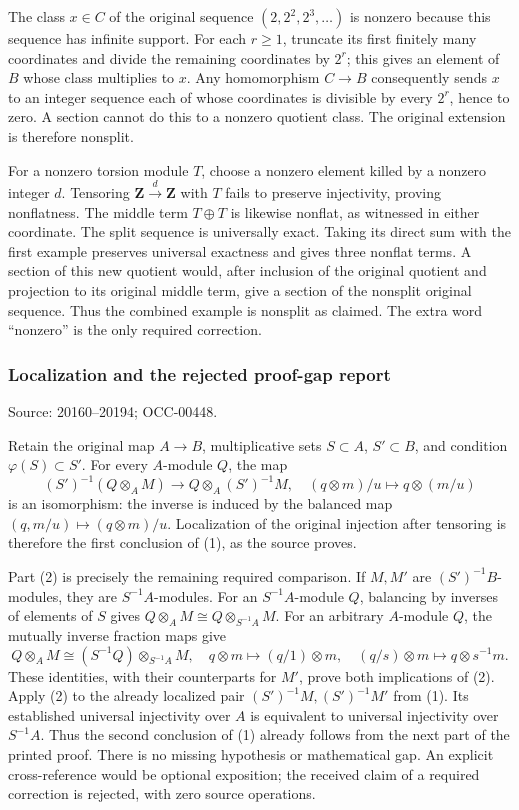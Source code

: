 The class \(x\in C\) of the original sequence \((2,2^2,2^3,\ldots)\) is nonzero because this sequence has infinite support. For each \(r\geq1\), truncate its first finitely many coordinates and divide the remaining coordinates by \(2^r\); this gives an element of \(B\) whose class multiplies to \(x\). Any homomorphism \(C\to B\) consequently sends \(x\) to an integer sequence each of whose coordinates is divisible by every \(2^r\), hence to zero. A section cannot do this to a nonzero quotient class. The original extension is therefore nonsplit.

For a nonzero torsion module \(T\), choose a nonzero element killed by a nonzero integer \(d\). Tensoring \(\mathbf Z\xrightarrow{d}\mathbf Z\) with \(T\) fails to preserve injectivity, proving nonflatness. The middle term \(T\oplus T\) is likewise nonflat, as witnessed in either coordinate. The split sequence is universally exact. Taking its direct sum with the first example preserves universal exactness and gives three nonflat terms. A section of this new quotient would, after inclusion of the original quotient and projection to its original middle term, give a section of the nonsplit original sequence. Thus the combined example is nonsplit as claimed. The extra word ``nonzero'' is the only required correction.

\subsubsection{Localization and the rejected proof-gap report}\label{algebra-proof-010-localization-and-the-rejected-proof-gap-report}

Source: 20160--20194; OCC-00448.

Retain the original map \(A\to B\), multiplicative sets \(S\subset A\), \(S'\subset B\), and condition \(\varphi(S)\subset S'\). For every \(A\)-module \(Q\), the map \[
(S')^{-1}(Q\otimes_AM)\longrightarrow Q\otimes_A(S')^{-1}M,
\quad (q\otimes m)/u\longmapsto q\otimes(m/u)
\] is an isomorphism: the inverse is induced by the balanced map \((q,m/u)\mapsto(q\otimes m)/u\). Localization of the original injection after tensoring is therefore the first conclusion of (1), as the source proves.

Part (2) is precisely the remaining required comparison. If \(M,M'\) are \((S')^{-1}B\)-modules, they are \(S^{-1}A\)-modules. For an \(S^{-1}A\)-module \(Q\), balancing by inverses of elements of \(S\) gives \(Q\otimes_AM\cong Q\otimes_{S^{-1}A}M\). For an arbitrary \(A\)-module \(Q\), the mutually inverse fraction maps give \[
Q\otimes_AM\cong(S^{-1}Q)\otimes_{S^{-1}A}M,
\quad q\otimes m\mapsto(q/1)\otimes m,
\quad(q/s)\otimes m\mapsto q\otimes s^{-1}m.
\] These identities, with their counterparts for \(M'\), prove both implications of (2). Apply (2) to the already localized pair \((S')^{-1}M,(S')^{-1}M'\) from (1). Its established universal injectivity over \(A\) is equivalent to universal injectivity over \(S^{-1}A\). Thus the second conclusion of (1) already follows from the next part of the printed proof. There is no missing hypothesis or mathematical gap. An explicit cross-reference would be optional exposition; the received claim of a required correction is rejected, with zero source operations.

